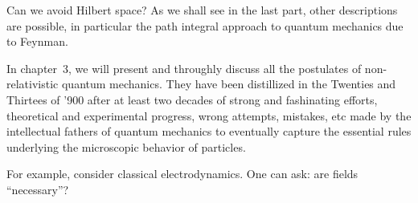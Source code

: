 \begin{refsection}
Can we avoid Hilbert space?
As we shall see in the last part, other descriptions are possible, in
particular the path integral approach to quantum mechanics due to Feynman. 

In chapter~3, we will present and throughly discuss  all the postulates of  
non-relativistic quantum
mechanics. 
They have been distillized in the Twenties and Thirtees of '900 after  at least two
decades of strong and fashinating efforts, 
theoretical and experimental progress, wrong
attempts, mistakes, etc 
made by the intellectual fathers of quantum mechanics 
to eventually capture the essential  rules underlying 
the microscopic behavior of particles.

For example, consider classical electrodynamics. 
One can ask: are fields ``necessary''?






\end{refsection}

